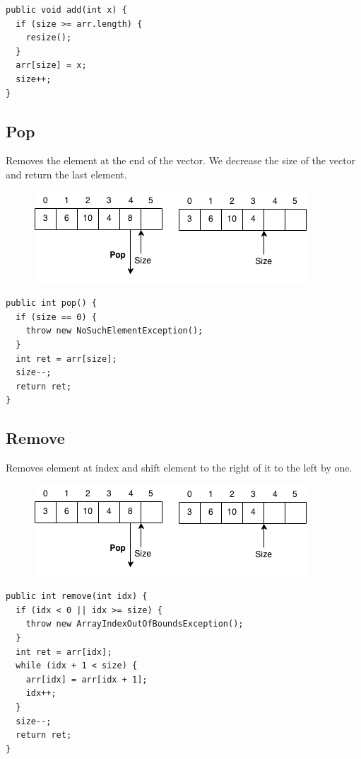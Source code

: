 \documentclass[11pt,oneside]{book}
\makeatletter
\def\maxwidth#1{\ifdim\Gin@nat@width>#1 #1\else\Gin@nat@width\fi}
\makeatother
\begin{document}
\begin{lstlisting}
public void add(int x) {
  if (size >= arr.length) {
    resize();
  }
  arr[size] = x;
  size++;
}
\end{lstlisting}

\subsection{Pop}

Removes the element at the end of the vector. We decrease the size of the vector and return the last element.

\vspace{5px}\begin{figure}[H]\centering
        \includegraphics[width=0.66\maxwidth{\textwidth}]{vector4.png}
        \end{figure}

\begin{lstlisting}
public int pop() {
  if (size == 0) {
    throw new NoSuchElementException();
  }
  int ret = arr[size];
  size--;
  return ret;
}
\end{lstlisting}

\subsection{Remove}

Removes element at index and shift element to the right of it to the left by one.

\vspace{5px}\begin{figure}[H]\centering
        \includegraphics[width=0.66\maxwidth{\textwidth}]{vector4.png}
        \end{figure}

\begin{lstlisting}
public int remove(int idx) {
  if (idx < 0 || idx >= size) {
    throw new ArrayIndexOutOfBoundsException();
  }
  int ret = arr[idx];
  while (idx + 1 < size) {
    arr[idx] = arr[idx + 1];
    idx++;
  }
  size--;
  return ret;
}
\end{lstlisting}
\end{document}
